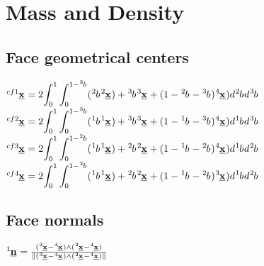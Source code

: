 \section{Mass and Density}
\subsection*{Face geometrical centers}
\smallskip

$\tensor[^{cf1}]{\underline{\mathbf{x}}}{} = 2 \mathlarger{\int_{0}^{1} \int_{0}^{1-\tensor[^3]{b}{}} (\tensor[^2]{b}{} \tensor[^2]{\underline{\mathbf{x}}}{}) + \tensor[^3]{b}{} \tensor[^3]{\underline{\mathbf{x}}}{} + (1 - \tensor[^2]{b}{} - \tensor[^3]{b}{}) \tensor[^4]{\underline{\mathbf{x}}}{}) d \tensor[^2]{b}{}d \tensor[^3]{b}{}}$ \\


$\tensor[^{cf2}]{\underline{\mathbf{x}}}{} = 2 \mathlarger{\int_{0}^{1} \int_{0}^{1-\tensor[^3]{b}{}} (\tensor[^1]{b}{} \tensor[^1]{\underline{\mathbf{x}}}{}) + \tensor[^3]{b}{} \tensor[^3]{\underline{\mathbf{x}}}{} + (1 - \tensor[^1]{b}{} - \tensor[^3]{b}{}) \tensor[^4]{\underline{\mathbf{x}}}{}) d \tensor[^1]{b}{}d \tensor[^3]{b}{}}$ \\

$\tensor[^{cf3}]{\underline{\mathbf{x}}}{} = 2 \mathlarger{\int_{0}^{1} \int_{0}^{1-\tensor[^2]{b}{}} (\tensor[^1]{b}{} \tensor[^1]{\underline{\mathbf{x}}}{}) + \tensor[^2]{b}{} \tensor[^2]{\underline{\mathbf{x}}}{} + (1 - \tensor[^1]{b}{} - \tensor[^2]{b}{}) \tensor[^4]{\underline{\mathbf{x}}}{}) d \tensor[^1]{b}{}d \tensor[^2]{b}{}}$ \\

$\tensor[^{cf4}]{\underline{\mathbf{x}}}{} = 2 \mathlarger{\int_{0}^{1} \int_{0}^{1-\tensor[^2]{b}{}} (\tensor[^1]{b}{} \tensor[^1]{\underline{\mathbf{x}}}{}) + \tensor[^2]{b}{} \tensor[^2]{\underline{\mathbf{x}}}{} + (1 - \tensor[^1]{b}{} - \tensor[^2]{b}{}) \tensor[^3]{\underline{\mathbf{x}}}{}) d \tensor[^1]{b}{}d \tensor[^2]{b}{}}$ \\

\subsection*{Face normals}
\smallskip

$\tensor[^1]{\underline{\mathbf{n}}}{} = \frac{(\tensor[^3]{\underline{\mathbf{x}}}{} - \tensor[^4]{\underline{\mathbf{x}}}{}) \wedge
(\tensor[^2]{\underline{\mathbf{x}}}{} -\tensor[^4]{\underline{\mathbf{x}}}{})}{\|(\tensor[^3]{\underline{\mathbf{x}}}{} - \tensor[^4]{\underline{\mathbf{x}}}{}) \wedge
(\tensor[^2]{\underline{\mathbf{x}}}{} -\tensor[^4]{\underline{\mathbf{x}}}{})\|}$ \\


